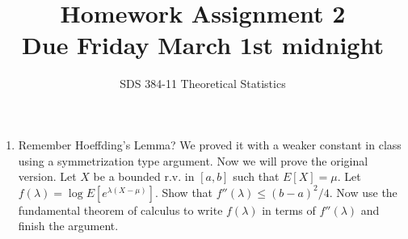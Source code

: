 \documentclass[11pt]{article}
\begin{document}
\title{{\bf Homework Assignment 2}\\Due Friday March 1st midnight}
\author{SDS 384-11 Theoretical Statistics}

\date{}

\maketitle{}
\begin{enumerate}%


\item Remember Hoeffding's Lemma? We proved it with a weaker constant in class using a symmetrization type argument. Now we will prove the original version. Let $X$ be a bounded r.v. in $[a,b]$ such that $E[X]=\mu$.
Let $f(\lambda)=\log E[e^{\lambda(X-\mu)}]$. Show that $f''(\lambda)\leq (b-a)^2/4$. Now use the fundamental theorem of calculus to write $f(\lambda)$ in terms of $f''(\lambda)$ and finish the argument.


\end{enumerate}
\end{document}
